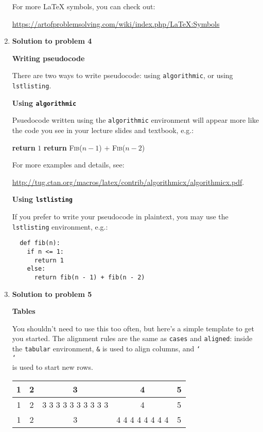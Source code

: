 \documentclass[11pt]{article}
\newcommand{\problemitem}[1]{
  \bigskip
  \item {\bf Solution to problem #1}
  \medskip
}
\newcommand{\BACKSLASH}{\char`\\ }
\begin{document}
\begin{enumerate}
For more LaTeX symbols, you can check out:

\url{https://artofproblemsolving.com/wiki/index.php/LaTeX:Symbols}

\newpage

\problemitem{4}

{\large \textbf{Writing pseudocode}}

There are two ways to write pseudocode: using \texttt{algorithmic}, or using
\texttt{lstlisting}.

\medskip
\textbf{Using \texttt{algorithmic}}

Psuedocode written using the \texttt{algorithmic} environment will appear more
like the code you see in your lecture slides and textbook, e.g.:

\begin{algorithmic}
      \State \textbf{return} $1$
    \Else
      \State \textbf{return} \textsc{Fib}($n - 1$) $+$ \textsc{Fib}($n - 2$)
    \EndIf
  \EndFunction
\end{algorithmic}

For more examples and details, see:

\url{http://tug.ctan.org/macros/latex/contrib/algorithmicx/algorithmicx.pdf}.

\medskip
\textbf{Using \texttt{lstlisting}}

If you prefer to write your pseudocode in plaintext, you may use the
\texttt{lstlisting} environment, e.g.:

\begin{lstlisting}
  def fib(n):
    if n <= 1:
      return 1
    else:
      return fib(n - 1) + fib(n - 2)
\end{lstlisting}


\problemitem{5}

{\large \textbf{Tables}}

You shouldn't need to use this too often, but here's a simple template to get
you started. The alignment rules are the same as \texttt{cases} and
\texttt{aligned}: inside the \texttt{tabular} environment, \texttt{\&} is used
to align columns, and \texttt{\BACKSLASH \BACKSLASH} is used to start new rows.

\begin{table}[tbh]
  \centering
  \renewcommand\arraystretch{1.5}
  \begin{tabular}{|c|c|c|c|c|}\hline
    1 & 2 & 3 & 4 & 5\\ \hline %
  1   & 2 &  3 3 3 3 3 3 3 3 3 3     &4&5 \\ \hline %
  1
      & 2 &3
& 4 4 4 4 4 4 4 4 & 5
\\
\hline %

  \end{tabular}
\end{table}

\end{enumerate}
\end{document}
